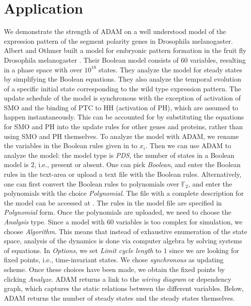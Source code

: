 \documentclass[11pt]{amsart}
\begin{document}
\section{Application} \label{benchmarks}
We demonstrate the strength of ADAM on a well understood model of the expression
pattern of the segment polarity genes in Drosophila melanogaster. Albert and Othmer built a model for embryonic pattern formation in the fruit fly Drosophila melanogaster \cite{AO}. Their Boolean
model consists of 60 variables, resulting in a phase
space with over $10^{18}$ states. They analyze the model for steady states by simplifying the Boolean equations. They also analyze the temporal evolution of a specific initial state corresponding to the wild type expression pattern. The update schedule of the model is synchronous  with the exception of activation of SMO and the binding of PTC to HH (activation of PH), which are assumed to happen instantaneously. This can be accounted for by substituting the equations for SMO and PH into the update rules for other genes and proteins, rather than using SMO and PH themselves.
To analyze the model with ADAM, we rename the variables in the Boolean rules given in \cite{AO} to $x_i$. Then we can use ADAM to analyze the model: the model type is {\it PDS}, the number of states in a Boolean model is $2$, i.e., present or absent. One can pick {\it Boolean}, and enter the Boolean rules in the text-area or upload a text file with the Boolean rules. Alternatively, one can first convert the Boolean rules to polynomials over $\mathbb F_2$, and enter the polynomials with the choice {\it Polynomial}.
The file with a complete description for the model can be accessed at \cite{DrosophilaModel}. The rules in the model file are specified in {\it Polynomial} form. Once the polynomials are uploaded, we need to choose the {\it Analysis} type. Since a model with $60$ variables is too complex for simulation, we choose {\it Algorithm}. This means that instead of exhaustive enumeration of the state space, analysis of the dynamics is done via computer algebra by solving systems of equations.
In {\it Options}, we set {\it Limit cycle length} to $1$ since we are looking for fixed points, i.e., time-invariant states.
We chose {\it synchronous} as updating scheme. Once these choices have been made,
we obtain the fixed points by clicking {\it Analyze}.
ADAM returns a link to the {\it wiring diagram} or dependency graph, which captures the static relations between the different variables. Below, ADAM returns the number of steady states and the steady states themselves.
\end{document}
